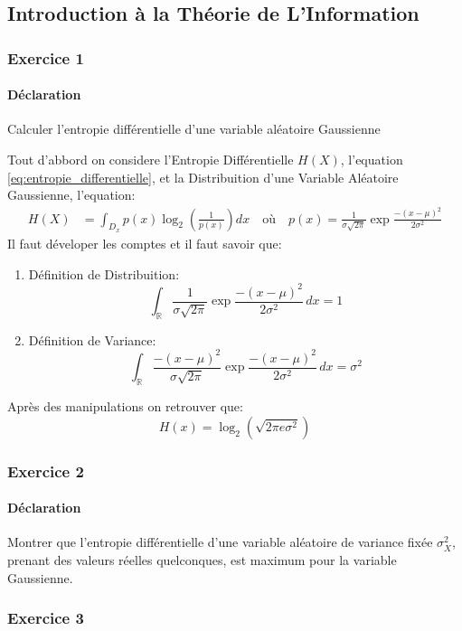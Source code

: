 \documentclass{article}
\begin{document}
\subsection{Introduction à la Théorie de L'Information}
\subsubsection{Exercice 1}
\paragraph{Déclaration}Calculer l'entropie différentielle d'une variable aléatoire Gaussienne
\begin{resolution}
Tout d'abbord on considere l'Entropie Différentielle $H(X)$, l'equation \ref{eq:entropie_differentielle}, et la Distribuition d'une Variable Aléatoire Gaussienne, l'equation:
\begin{align*}
    H(X) &= \int_{D_x} p(x) \log_{2} \left( \frac{1}{p(x)} \right) dx
    \quad\text{où}\quad
    p(x) = \frac{1}{\sigma\sqrt{2\pi}} \exp{\frac{-(x - \mu)^2}{2\sigma^2}}
\end{align*}
Il faut déveloper les comptes et il faut savoir que:
\begin{enumerate}
    \item Définition de Distribuition:
    \begin{equation}
        \int_{\mathbb{R}} \frac{1}{\sigma\sqrt{2\pi}} \exp{\frac{-(x - \mu)^2}{2\sigma^2}}\,dx = 1
    \end{equation}
    \item Définition de Variance:
    \begin{equation}
        \int_{\mathbb{R}} \frac{-(x - \mu)^2}{\sigma\sqrt{2\pi}} \exp{\frac{-(x - \mu)^2}{2\sigma^2}}\,dx = \sigma^2
    \end{equation}
\end{enumerate}
Après des manipulations on retrouver que:
\begin{equation}
    \boxed{
        H(x) = \log_{2} (\sqrt{2\pi e \sigma^2})
    }
\end{equation}
\end{resolution}

\subsubsection{Exercice 2}
\paragraph{Déclaration}Montrer que l'entropie différentielle d'une variable aléatoire de variance fixée $\sigma_{X}^{2}$, prenant des valeurs réelles quelconques, est maximum pour la variable Gaussienne.
\begin{resolution}
    
\end{resolution}

\subsubsection{Exercice 3}
\begin{resolution}
    
\end{resolution}
\end{document}
